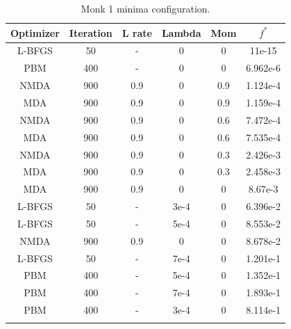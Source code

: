 \begin{longtable}{|c|c|c|c|c|c|}
	\hline
	\centering
	 \textbf{Optimizer}&\textbf{Iteration} & \textbf{L rate} & \multicolumn{1}{l|}{\textbf{Lambda}} & \textbf{Mom} & \textbf{$f^{*}$} \\ \hline 
			L-BFGS & 50 & - & 0  & 0 & 11e-15  \\
			PBM & 400 & - & 0  & 0 & 6.962e-6 \\
			NMDA & 900 & 0.9 & 0  & 0.9 & 1.124e-4  \\
			MDA & 900 & 0.9 & 0  & 0.9 & 1.159e-4 \\
			NMDA & 900 & 0.9 & 0  & 0.6 & 7.472e-4  \\
			MDA & 900 & 0.9 & 0  & 0.6 & 7.535e-4 \\
			NMDA & 900 & 0.9 & 0  & 0.3 & 2.426e-3 \\
			MDA & 900 & 0.9 & 0  & 0.3 & 2.458e-3 \\
			MDA & 900 & 0.9 & 0  & 0 & 8.67e-3 \\
			L-BFGS & 50 & - & 3e-4  & 0 & 6.396e-2 \\
			L-BFGS & 50 & - & 5e-4  & 0 & 8.553e-2 \\
			NMDA & 900 & 0.9 & 0  & 0 & 8.678e-2 \\
			L-BFGS & 50 & - & 7e-4  & 0 & 1.201e-1 \\
			PBM & 400 & - & 5e-4  & 0 & 1.352e-1  \\
			PBM & 400 & - & 7e-4  & 0 & 1.893e-1  \\
			PBM & 400 & - & 3e-4  & 0 & 8.114e-1  \\
 \hline
\caption{Monk 1 minima configuration.}
\label{tab:nets_res_plots_Monk1}
\end{longtable}
